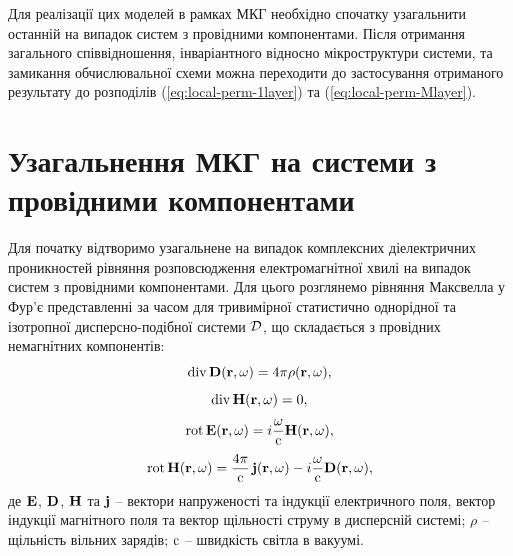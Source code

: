 \documentclass[14pt,twoside]{vakthesis}
\begin{document}
Для реалізації цих моделей в рамках МКГ необхідно спочатку узагальнити останній на випадок систем з провідними компонентами. Після отримання загального співвідношення, інваріантного відносно мікроструктури системи, та замикання обчислювальної схеми можна переходити до застосування отриманого результату до розподілів (\ref{eq:local-perm-1layer}) та (\ref{eq:local-perm-Mlayer}).


\section{Узагальнення МКГ на системи з провідними компонентами}\label{sec:CGA_theory}

Для початку відтворимо узагальнене на випадок комплексних діелектричних проникностей рівняння  розповсюдження електромагнітної хвилі на випадок систем з провідними компонентами. 
Для цього розглянемо рівняння Максвелла у Фур'є представленні за часом для тривимірної статистично однорідної та ізотропної дисперсно-подібної системи $\cal{D}$, що складається з провідних немагнітних компонентів:
\begin{equation}\label{eq:MEdiv-D}
{\rm div}\,{\bf D}({\bf r}, \omega) = 4 \pi \rho({\bf r}, \omega),
\end{equation}
\begin{equation}\label{eq:MEdiv-H}
{\rm div}\,{\bf H}({\bf r}, \omega) = 0,
\end{equation}
\begin{equation}\label{eq:MErot-D}
{\rm rot}\,{\bf E}({\bf r}, \omega) = i\frac{\omega}{\rm c} {\bf H}({\bf r}, \omega), 
\end{equation}
\begin{equation}\label{eq:MErot-H}
{\rm rot}\,{\bf H}({\bf r}, \omega) = \frac{4\pi}{\rm c}\,{\bf j}({\bf r}, \omega) - i\frac{\omega}{\rm c} {\bf D}({\bf r}, \omega),
\end{equation}
де ${\bf E}$, ${\bf D}$, ${\bf H}$ та ${\bf j}$ -- вектори напруженості та індукції електричного поля, вектор індукції магнітного поля та вектор щільності струму в дисперсній системі; $\rho$ -- щільність вільних зарядів; ${\rm c}$ -- швидкість світла в вакуумі. 
\end{document}
